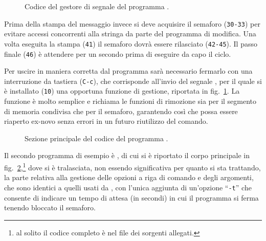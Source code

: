 \begin{figure}[!htb]
  \footnotesize \centering
  \begin{minipage}[c]{\codesamplewidth}
  \end{minipage} 
  \normalsize 
  \caption{Codice del gestore di segnale del programma
    .}
  \label{fig:ipc_posix_sem_shm_message_server_handler}
\end{figure}

Prima della stampa del messaggio invece si deve acquisire il semaforo
(\texttt{\small 30-33}) per evitare accessi concorrenti alla stringa da parte
del programma di modifica. Una volta eseguita la stampa (\texttt{\small 41})
il semaforo dovrà essere rilasciato (\texttt{\small 42-45}). Il passo finale
(\texttt{\small 46}) è attendere per un secondo prima di eseguire da capo il
ciclo. 

Per uscire in maniera corretta dal programma sarà necessario fermarlo con una
interruzione da tastiera (\texttt{C-c}), che corrisponde all'invio del segnale
, per il quale si è installato (\texttt{\small 10}) una
opportuna funzione di gestione, riportata in
fig.~\ref{fig:ipc_posix_sem_shm_message_server_handler}. La funzione è molto
semplice e richiama le funzioni di rimozione sia per il segmento di memoria
condivisa che per il semaforo, garantendo così che possa essere riaperto
ex-novo senza errori in un futuro riutilizzo del comando.

\begin{figure}[!htb]
  \footnotesize \centering
  \begin{minipage}[c]{\codesamplewidth}
  \end{minipage} 
  \normalsize 
  \caption{Sezione principale del codice del programma
    .}
  \label{fig:ipc_posix_sem_shm_message_setter}
\end{figure}

Il secondo programma di esempio è , di cui si è
riportato il corpo principale in
fig.~\ref{fig:ipc_posix_sem_shm_message_setter},\footnote{al solito il codice
  completo è nel file dei sorgenti allegati.} dove si è tralasciata, non
essendo significativa per quanto si sta trattando, la parte relativa alla
gestione delle opzioni a riga di comando e degli argomenti, che sono identici
a quelli usati da , con l'unica aggiunta di un'opzione
``\texttt{-t}'' che consente di indicare un tempo di attesa (in secondi) in
cui il programma si ferma tenendo bloccato il semaforo.


